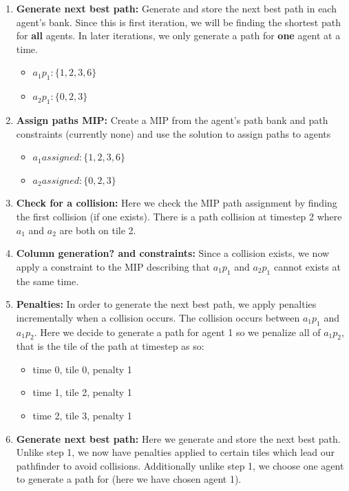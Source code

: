 \documentclass[a4paper,11pt]{article}
\begin{document}
\begin{enumerate}
	\item \textbf{Generate next best path:} Generate and store the next best path in each agent's bank. Since this is first iteration, we will be finding the shortest path for \textbf{all} agents. In later iterations, we only generate a path for \textbf{one} agent at a time.
	\begin{itemize}
		\item $a_1p_1: \{1, 2, 3, 6\}$
		\item $a_2p_1: \{0, 2, 3\}$
	\end{itemize}
	\item \textbf{Assign paths MIP:} Create a MIP from the agent's path bank and path constraints (currently none) and use the solution to assign paths to agents
	\begin{itemize}
		\item $a_1assigned: \{1, 2, 3, 6\}$
		\item $a_2assigned: \{0, 2, 3\}$
	\end{itemize}
	\item \textbf{Check for a collision:} Here we check the MIP path assignment by finding the first collision (if one exists). There is a path collision at timestep 2 where $a_1$ and $a_2$ are both on tile 2.
	\item \textbf{Column generation? and constraints:} Since a collision exists, we now apply a constraint to the MIP describing that $a_1p_1$ and $a_2p_1$ cannot exists at the same time.
	\item \textbf{Penalties:} In order to generate the next best path, we apply penalties incrementally when a collision occurs. The collision occurs between $a_1p_1$ and $a_1p_2$. Here we decide to generate a path for agent 1 so we penalize all of $a_1p_2$, that is the tile of the path at timestep as so:
	\begin{itemize}
		\item time 0, tile 0, penalty 1
		\item time 1, tile 2, penalty 1
		\item time 2, tile 3, penalty 1
	\end{itemize}
	\item \textbf{Generate next best path:} Here we generate and store the next best path. Unlike step 1, we now have penalties applied to certain tiles which lead our pathfinder to avoid collisions. Additionally unlike step 1, we choose one agent to generate a path for (here we have chosen agent 1).
	\begin{itemize}

\end{itemize}
\end{enumerate}
\end{document}
